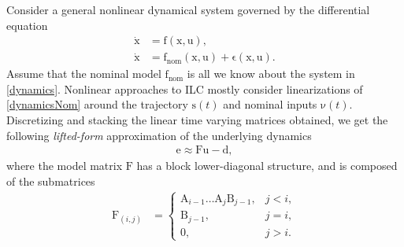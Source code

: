 \documentclass[10pt,a4paper]{article}
\theoremstyle{plain}
\theoremstyle{definition}
\newcommand{\boldvec}[1]{\boldsymbol{\mathrm{#1}}}
\let\vec\boldvec
\newcommand{\state}{\vec{x}} %
\newcommand{\error}{\vec{e}} %
\newcommand{\traj}{\vec{s}} %
\newcommand{\dist}{\vec{\epsilon}} %
\newcommand{\linDist}{\vec{d}} %
\newcommand{\sysInput}{\vec{u}} %
\newcommand{\trjInput}{\vec{\nu}} %
\newcommand{\systemMat}{\vec{F}} %
\newcommand{\dynamics}{\vec{f}}
\newcommand{\dynamicsNominal}{\dynamics_{\mathrm{nom}}}
\begin{document}
Consider a general nonlinear dynamical system governed by the differential equation
%
\begin{align}
\dot{\state} &= \dynamics(\state,\sysInput), \label{dynamics} \\
\dot{\state} &= \dynamicsNominal(\state,\sysInput) + \dist(\state,\sysInput). \label{dynamicsNom}
\end{align}
%
\noindent Assume that the nominal model $\dynamicsNominal$ is all we know about the system in \eqref{dynamics}. Nonlinear approaches to ILC mostly consider linearizations of \eqref{dynamicsNom} around the trajectory $\traj(t)$ and nominal inputs $\trjInput(t)$. Discretizing and stacking the linear time varying matrices obtained, we get the following \emph{lifted-form} approximation of the underlying dynamics
%
\begin{equation}
\begin{aligned}
\error \approx \systemMat \sysInput - \linDist,
\end{aligned}
\label{approxModel}
\end{equation}
%
\noindent where the model matrix $\systemMat$ has a block lower-diagonal structure, and is composed of the submatrices
%
\begin{equation}
\begin{aligned}
\vec{F}_{(i,j)} &= \left \{
\begin{array}{cc}
\vec{A}_{i-1}\ldots \vec{A}_j \vec{B}_{j-1}, & j < i, \\ 
\vec{B}_{j-1}, & j = i, \\
\vec{0}, & j > i. 
\end{array} \right.
\end{aligned}
\label{Fmatrix}
\end{equation}
\end{document}
